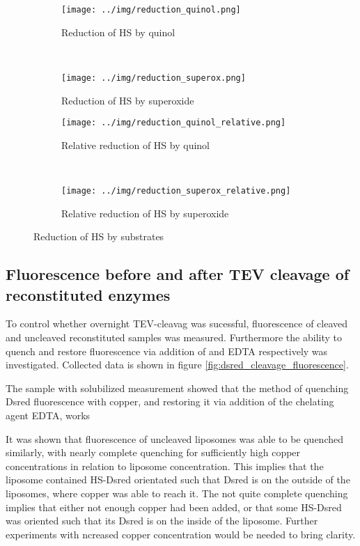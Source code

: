 \begin{figure}
    \centering
    \begin{subfigure}{0.45\textwidth}
	\centering
	\texttt{[image: ../img/reduction\_quinol.png]}
	\caption{Reduction of HS by quinol}
	\label{fig:reduction_quinol}
    \end{subfigure}
    ~
    \begin{subfigure}{0.45\textwidth}
	\centering
	\texttt{[image: ../img/reduction\_superox.png]}
	\caption{Reduction of HS by superoxide}
	\label{fig:reduction_superox}
    \end{subfigure}

    \begin{subfigure}{0.45\textwidth}
	\centering
	\texttt{[image: ../img/reduction\_quinol\_relative.png]}
	\caption{Relative reduction of HS by quinol}
	\label{fig:reduction_quinol_relative}
    \end{subfigure}
    ~
    \begin{subfigure}{0.45\textwidth}
	\centering
	\texttt{[image: ../img/reduction\_superox\_relative.png]}
	\caption{Relative reduction of HS by superoxide}
	\label{fig:reduction_superox_relative}
    \end{subfigure}
    \caption{Reduction of HS by substrates}
    \label{fig:hs_reduction}
\end{figure}


\subsection{Fluorescence before and after TEV cleavage of reconstituted enzymes}

To control whether overnight TEV-cleavag was sucessful, fluorescence of cleaved
and uncleaved reconstituted samples was measured. Furthermore the ability to
quench and restore fluorescence via addition of  and EDTA
respectively was investigated. Collected data is shown in figure
\ref{fig:dsred_cleavage_fluorescence}.

The sample with solubilized measurement showed that the method of quenching
Dsred fluorescence with copper, and restoring it via addition of the chelating
agent EDTA, works

It was shown that fluorescence of uncleaved liposomes was able to be quenched
similarly, with nearly complete quenching for sufficiently high copper
concentrations in relation to liposome concentration. This implies that the
liposome contained HS-Dsred orientated such that Dsred is on the outside of the
liposomes, where copper was able to reach it. The not quite complete quenching
implies that either not enough copper had been added, or that some HS-Dsred was
oriented such that its Dsred is on the inside of the liposome. Further
experiments with ncreased copper concentration would be needed to bring
clarity.

